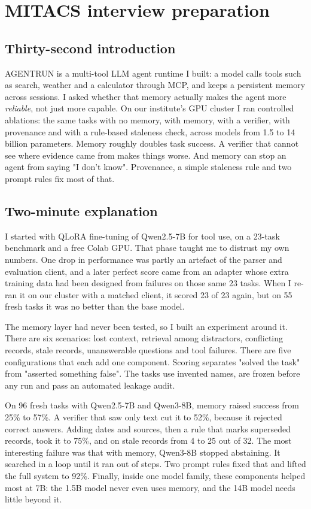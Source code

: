 \documentclass[10.5pt,a4paper,oneside]{report}
\begin{document}
\chapter{MITACS interview preparation}
\section{Thirty-second introduction}
AGENTRUN is a multi-tool LLM agent runtime I built: a model calls tools such as search, weather and a calculator through MCP, and keeps a persistent memory across sessions. I asked whether that memory actually makes the agent more \emph{reliable}, not just more capable. On our institute's GPU cluster I ran controlled ablations: the same tasks with no memory, with memory, with a verifier, with provenance and with a rule-based staleness check, across models from 1.5 to 14 billion parameters. Memory roughly doubles task success. A verifier that cannot see where evidence came from makes things worse. And memory can stop an agent from saying "I don't know". Provenance, a simple staleness rule and two prompt rules fix most of that.

\section{Two-minute explanation}
I started with QLoRA fine-tuning of Qwen2.5-7B for tool use, on a 23-task benchmark and a free Colab GPU. That phase taught me to distrust my own numbers. One drop in performance was partly an artefact of the parser and evaluation client, and a later perfect score came from an adapter whose extra training data had been designed from failures on those same 23 tasks. When I re-ran it on our cluster with a matched client, it scored 23 of 23 again, but on 55 fresh tasks it was no better than the base model.

The memory layer had never been tested, so I built an experiment around it. There are six scenarios: lost context, retrieval among distractors, conflicting records, stale records, unanswerable questions and tool failures. There are five configurations that each add one component. Scoring separates "solved the task" from "asserted something false". The tasks use invented names, are frozen before any run and pass an automated leakage audit.

On 96 fresh tasks with Qwen2.5-7B and Qwen3-8B, memory raised success from 25\% to 57\%. A verifier that saw only text cut it to 52\%, because it rejected correct answers. Adding dates and sources, then a rule that marks superseded records, took it to 75\%, and on stale records from 4 to 25 out of 32. The most interesting failure was that with memory, Qwen3-8B stopped abstaining. It searched in a loop until it ran out of steps. Two prompt rules fixed that and lifted the full system to 92\%. Finally, inside one model family, these components helped most at 7B: the 1.5B model never even uses memory, and the 14B model needs little beyond it.
\end{document}
